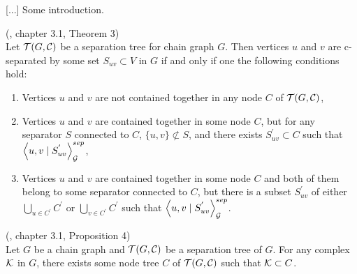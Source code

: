 %
%

[...] Some introduction.


\begin{thm} \label{LCDSkeletonThm} (\cite{CG}, chapter 3.1, Theorem 3) \\ 
	Let $\mathcal{T}(G, \mathcal{C})$ be a separation tree for chain graph $G$. Then vertices $u$ and $v$ are 
	c-separated by some set $S_{uv} \subset V$ in $G$ if and only if one the following conditions hold:
	
	\begin{enumerate}
		\item Vertices $u$ and $v$ are not contained together in any node $C$ of $\mathcal{T}(G, \mathcal{C})$,
		
		\item Vertices $u$ and $v$ are contained together in some node $C$, but for any separator $S$ connected
		to $C$, $\{u, v \} \not \subset S$, and there exists $S_{uv}^{'} \subset C$ such 
		that $\left\langle u , v \mid S_{uv}^{'} \right\rangle_{\mathcal{G}}^{sep}$,
		
		\item Vertices $u$ and $v$ are contained together in some node $C$ and both of them belong to some separator
		connected to $C$, but there is a subset $S_{uv}^{'}$ of either $\bigcup_{u \in C^{'}} C^{'}$ or
		$\bigcup_{v \in C^{'}} C^{'}$ such that $\left\langle u , v \mid S_{uv}^{'} \right\rangle_{\mathcal{G}}^{sep}$.
	\end{enumerate}
\end{thm}


 
\begin{prop} \label{LCDComplexProp} (\cite{CG}, chapter 3.1, Proposition 4) \\
	Let $G$ be a chain graph and $\mathcal{T}(G, \mathcal{C})$ be a separation tree of $G$. For any complex $\mathcal{K}$ in $G$, there
	exists some node tree $C$ of $\mathcal{T}(G, \mathcal{C})$ such that $\mathcal{K} \subset C$.
\end{prop}

